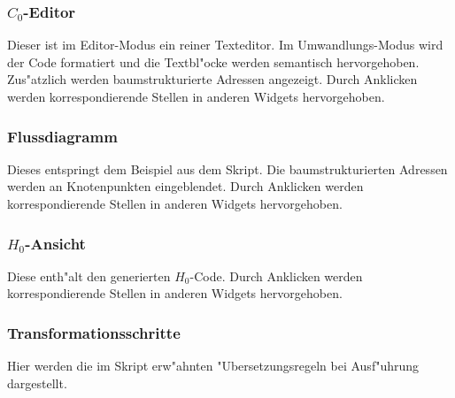 	\subsubsection{$C_0$-Editor}
		\begin{description}
			Dieser ist im Editor-Modus ein reiner Texteditor.
			Im Umwandlungs-Modus wird der Code formatiert und die Textbl"ocke werden semantisch hervorgehoben.
			Zus"atzlich werden baumstrukturierte Adressen angezeigt.
			Durch Anklicken werden korrespondierende Stellen in anderen Widgets hervorgehoben.
		\end{description}

	\subsubsection{Flussdiagramm}
		\begin{description}
			Dieses entspringt dem Beispiel aus dem Skript.
			Die baumstrukturierten Adressen werden an Knotenpunkten eingeblendet.
			Durch Anklicken werden korrespondierende Stellen in anderen Widgets hervorgehoben.
		\end{description}

	\subsubsection{$H_0$-Ansicht}
		\begin{description}
			Diese enth"alt den generierten $H_0$-Code.
			Durch Anklicken werden korrespondierende Stellen in anderen Widgets hervorgehoben.
		\end{description}	

	\subsubsection{Transformationsschritte}
		\begin{description}
			Hier werden die im Skript erw"ahnten "Ubersetzungsregeln bei Ausf"uhrung dargestellt.
		\end{description}


